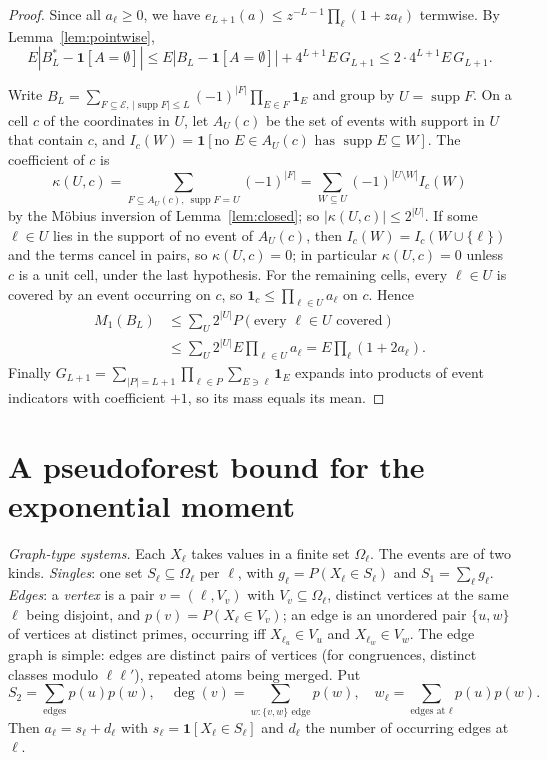 \documentclass[11pt,reqno]{amsart}
\theoremstyle{definition}
\newcommand{\supp}{\operatorname{supp}}
\begin{document}
\begin{proof}
Since all $a_\ell\ge0$, we have $e_{L+1}(a)\le z^{-L-1}\prod_\ell(1+za_\ell)$
termwise.  By
Lemma~\ref{lem:pointwise},
\[
 E|B^*_L-\mathbf 1[A=\emptyset]|\le E|B_L-\mathbf 1[A=\emptyset]|+4^{L+1}E\,G_{L+1}
 \le2\cdot4^{L+1}E\,G_{L+1}.
\]

Write $B_L=\sum_{F\subseteq\mathcal E,\,|\supp F|\le L}(-1)^{|F|}\prod_{E\in F}\mathbf 1_E$
and group by $U=\supp F$.  On a cell $c$ of the coordinates in $U$, let
$A_U(c)$ be the set of events with support in $U$ that contain $c$, and
$I_c(W)=\mathbf 1[\text{no }E\in A_U(c)\text{ has }\supp E\subseteq W]$.  The
coefficient of $c$ is
\[
 \kappa(U,c)=\sum_{F\subseteq A_U(c),\ \supp F=U}(-1)^{|F|}
 =\sum_{W\subseteq U}(-1)^{|U\setminus W|}I_c(W)
\]
by the M\"obius inversion of Lemma~\ref{lem:closed}; so $|\kappa(U,c)|\le2^{|U|}$.
If some $\ell\in U$ lies in the support of no event of $A_U(c)$, then
$I_c(W)=I_c(W\cup\{\ell\})$ and the terms cancel in pairs, so $\kappa(U,c)=0$; in
particular $\kappa(U,c)=0$ unless $c$ is a unit cell, under the last
hypothesis.  For the remaining cells, every $\ell\in U$ is covered by an event
occurring on $c$, so $\mathbf 1_c\le\prod_{\ell\in U}a_\ell$ on $c$.  Hence
\begin{align*}
 M_1(B_L)&\le\sum_U2^{|U|}P(\text{every }\ell\in U\text{ covered})\\
 &\le\sum_U2^{|U|}E\prod_{\ell\in U}a_\ell=E\prod_\ell(1+2a_\ell).
\end{align*}
Finally $G_{L+1}=\sum_{|P|=L+1}\prod_{\ell\in P}\sum_{E\ni\ell}\mathbf 1_E$ expands
into products of event indicators with coefficient $+1$, so its mass equals its
mean.
\end{proof}

\section{A pseudoforest bound for the exponential moment}\label{sec:pseudo}

\emph{Graph-type systems.}  Each $X_\ell$ takes values in a finite set
$\Omega_\ell$.  The events are of two kinds.  \emph{Singles}: one set
$S_\ell\subseteq\Omega_\ell$ per $\ell$, with $g_\ell=P(X_\ell\in S_\ell)$ and
$S_1=\sum_\ell g_\ell$.  \emph{Edges}: a \emph{vertex} is a pair $v=(\ell,V_v)$
with $V_v\subseteq\Omega_\ell$, distinct vertices at the same $\ell$ being
disjoint, and $p(v)=P(X_\ell\in V_v)$; an edge is an unordered pair $\{u,w\}$ of
vertices at distinct primes, occurring iff $X_{\ell_u}\in V_u$ and
$X_{\ell_w}\in V_w$.  The edge graph is simple: edges are distinct pairs of
vertices (for congruences, distinct classes modulo $\ell\ell'$), repeated atoms
being merged.  Put
\[
 S_2=\sum_{\text{edges}}p(u)p(w),\quad \deg(v)=\sum_{w:\{v,w\}\text{ edge}}p(w),\quad
 w_\ell=\sum_{\text{edges at }\ell}p(u)p(w).
\]
Then $a_\ell=s_\ell+d_\ell$ with $s_\ell=\mathbf 1[X_\ell\in S_\ell]$ and $d_\ell$ the
number of occurring edges at $\ell$.
\end{document}
